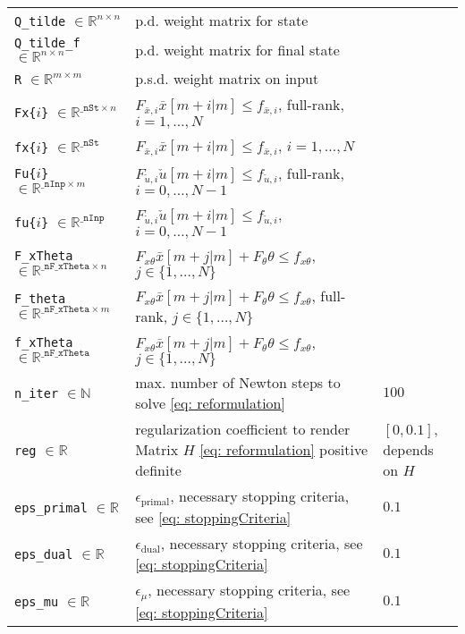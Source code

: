 \documentclass[letter]{article}
\begin{document}
\begin{sffamily}
\begin{table}[!htdp]
\begin{center}
\begin{tabular}{|l|l|l|}
 \texttt{Q\_tilde} $\in\mathbb{R}^{n\times n}$ & p.d. weight matrix for state & \\ 
 \texttt{Q\_tilde\_f} $\in\mathbb{R}^{n\times n}$ & p.d. weight matrix for final state & \\ 
 \texttt{R} $\in\mathbb{R}^{m\times m}$ & p.s.d. weight matrix on input & \\ \hline
 
 \texttt{Fx\{$i$\}} $\in\mathbb{R}^{\texttt{\_nSt}\times n}$ & $F_{\bar{x},i}\bar{x}[m+i|m] \leq f_{\bar{x},i}$, full-rank, $i=1,\ldots,N$ & \\ 
 \texttt{fx\{$i$\}} $\in\mathbb{R}^{\texttt{\_nSt}}$ & $F_{\bar{x},i}\bar{x}[m+i|m] \leq f_{\bar{x},i}$, $i=1,\ldots,N$ & \\ 
 \texttt{Fu\{$i$\}} $\in\mathbb{R}^{\texttt{\_nInp}\times m}$ & $F_{\check{u},i}\check{u}[m+i|m] \leq f_{\check{u},i}$, full-rank, $i=0,\ldots,N-1$ & \\ 
 \texttt{fu\{$i$\}} $\in\mathbb{R}^{\texttt{\_nInp}}$ & $F_{\check{u},i}\check{u}[m+i|m] \leq f_{\check{u},i}$, $i=0,\ldots,N-1$ & \\ 
 \texttt{F\_xTheta} $\in\mathbb{R}^{\texttt{\_nF\_xTheta}\times n}$ & $F_{x\theta}\bar{x}[m+j|m] + F_\theta \theta \leq f_{x\theta}$, $j\in\{1,\ldots,N\}$ & \\ 
 \texttt{F\_theta} $\in\mathbb{R}^{\texttt{\_nF\_xTheta}\times m}$ & $F_{x\theta}\bar{x}[m+j|m] + F_\theta \theta \leq f_{x\theta}$, full-rank, $j\in\{1,\ldots,N\}$ & \\ 
 \texttt{f\_xTheta} $\in\mathbb{R}^{\texttt{\_nF\_xTheta}}$ & $F_{x\theta}\bar{x}[m+j|m] + F_\theta \theta \leq f_{x\theta}$, $j\in\{1,\ldots,N\}$ & \\ \hline 

 \texttt{n\_iter} $\in\mathbb{N}$ & max. number of Newton steps to solve \eqref{eq: reformulation} & $100$ \\ 
 \texttt{reg} $\in\mathbb{R}$  & regularization coefficient to render Matrix $H$ \eqref{eq: reformulation} positive definite & $[0,0.1]$, depends on $H$ \\ 
 \texttt{eps\_primal}  $\in\mathbb{R}$& $\epsilon_\text{primal}$, necessary stopping criteria, see \eqref{eq: stoppingCriteria} & $0.1$ \\ 
 \texttt{eps\_dual} $\in\mathbb{R}$ & $\epsilon_\text{dual}$, necessary stopping criteria, see \eqref{eq: stoppingCriteria} & $0.1$ \\ 
 \texttt{eps\_mu} $\in\mathbb{R}$ & $\epsilon_\mu$, necessary stopping criteria, see \eqref{eq: stoppingCriteria} & $0.1$ \\ \hline
\end{tabular}
\end{center}
\label{tab: parameters Init.m}
\end{table}


\end{sffamily}
\end{document}
